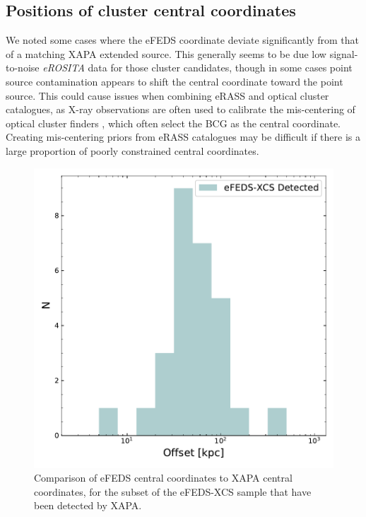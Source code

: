 \documentclass[fleqn,usenatbib]{mnras}
\begin{document}
\subsection{Positions of cluster central coordinates}
We noted some cases where the eFEDS coordinate deviate significantly from that of a matching XAPA extended source. This generally seems to be due low signal-to-noise {\em eROSITA} data for those cluster candidates, though in some cases point source contamination appears to shift the central coordinate toward the point source. This could cause issues when combining eRASS and optical cluster catalogues, as X-ray observations are often used to calibrate the mis-centering of optical cluster finders \citep[][]{desmiscentering}, which often select the BCG as the central coordinate. Creating mis-centering priors from eRASS catalogues may be difficult if there is a large proportion of poorly constrained central coordinates.

\begin{figure}
    \centering
    \includegraphics[width=0.95\columnwidth]{images/eFEDS_XAPA_offset.pdf}
    \caption[]{Comparison of eFEDS central coordinates to XAPA central coordinates, for the subset of the eFEDS-XCS sample that have been detected by XAPA.}
    \label{fig:centcoords}
\end{figure}
\end{document}
